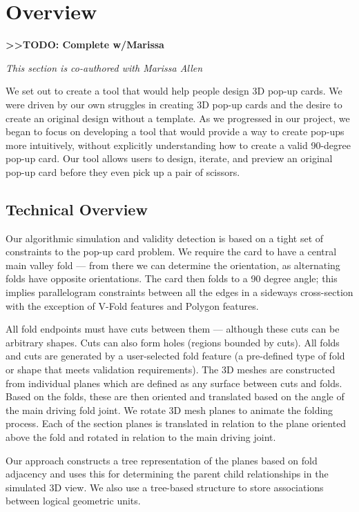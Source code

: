 \section{Overview}\label{overview}

\textbf{\textgreater{}\textgreater{}TODO: Complete w/Marissa}

\emph{This section is co-authored with Marissa Allen}

We set out to create a tool that would help people design 3D pop-up
cards. We were driven by our own struggles in creating 3D pop-up cards
and the desire to create an original design without a template. As we
progressed in our project, we began to focus on developing a tool that
would provide a way to create pop-ups more intuitively, without
explicitly understanding how to create a valid 90-degree pop-up card.
Our tool allows users to design, iterate, and preview an original pop-up
card before they even pick up a pair of scissors.

\subsection{Technical Overview}\label{technical-overview}

Our algorithmic simulation and validity detection is based on a tight
set of constraints to the pop-up card problem. We require the card to
have a central main valley fold --- from there we can determine the
orientation, as alternating folds have opposite orientations. The card
then folds to a 90 degree angle; this implies parallelogram constraints
between all the edges in a sideways cross-section with the exception of
V-Fold features and Polygon features.

All fold endpoints must have cuts between them --- although these cuts
can be arbitrary shapes. Cuts can also form holes (regions bounded by
cuts). All folds and cuts are generated by a user-selected fold feature
(a pre-defined type of fold or shape that meets validation
requirements). The 3D meshes are constructed from individual planes
which are defined as any surface between cuts and folds. Based on the
folds, these are then oriented and translated based on the angle of the
main driving fold joint. We rotate 3D mesh planes to animate the folding
process. Each of the section planes is translated in relation to the
plane oriented above the fold and rotated in relation to the main
driving joint.

Our approach constructs a tree representation of the planes based on
fold adjacency and uses this for determining the parent child
relationships in the simulated 3D view. We also use a tree-based
structure to store associations between logical geometric units.

